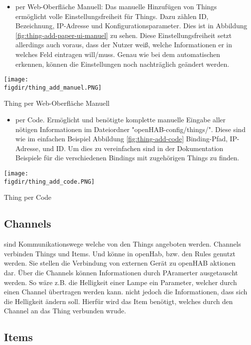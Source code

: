 \begin{itemize}	
	\item per Web-Oberfläche Manuell: Das manuelle Hinzufügen von Things ermöglicht volle Einstellungsfreiheit für Things. Dazu zählen ID, Bezeichnung, IP-Adresse und Konfigurationsparameter. Dies ist in Abbildung \ref{fig:thing-add-paper-ui-manuel} zu sehen. Diese Einstellungsfreiheit setzt allerdings auch voraus, dass der Nutzer weiß, welche Informationen er in welches Feld eintragen will/muss. Genau wie bei dem automatischen erkennen, können die Einstellungen noch nachträglich geändert werden. 
\end{itemize}
	\centering
	\captionsetup{type=figure}
	\texttt{[image: \\figdir/thing\_add\_manuel.PNG]}
	\caption{Thing per Web-Oberfläche Manuell \label{fig:thing-add-paper-ui-manuel}}

\begin{itemize}	
	\item per Code. Ermöglicht und benötigte komplette manuelle Eingabe aller nötigen Informationen im Dateiordner "openHAB-config/things/". Diese sind wie im einfachen Beispiel Abbildung \ref{fig:thing-add-code} Binding-Pfad, IP-Adresse, und ID. Um dies zu vereinfachen sind in der Dokumentation Beispiele für die verschiedenen Bindings mit zugehörigen Things zu finden.
\end{itemize}
	\centering
	\captionsetup{type=figure}
	\texttt{[image: \\figdir/thing\_add\_code.PNG]}
	\caption{Thing per Code \label{fig:thing-add-code}}

\subsection{Channels} \label{sec:channels}
sind Kommunikationswege welche von den Things angeboten werden. Channels verbinden Things und Items. Und könne in openHab, bzw. den Rules genutzt werden. Sie stellen die Verbindung von externen Gerät zu openHAB aktionen dar. Über die Channels können Informationen durch PAramerter ausgetauscht werden. So wäre z.B. die Helligkeit einer Lampe ein Parameter, welcher durch einen Channel übertragen werden kann. nicht jedoch die Informationen, dass sich die Helligkeit ändern soll. Hierfür wird das Item benötigt, welches durch den Channel an das Thing verbunden wrude.

\subsection{Items}

